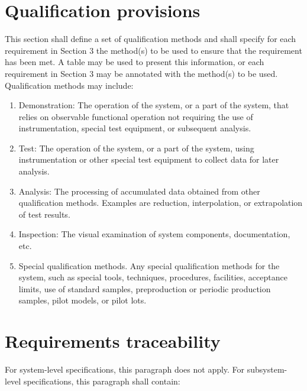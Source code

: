 \section{Qualification provisions}

This section shall define a set of qualification methods and shall
specify for each requirement in Section 3 the method(s) to be used to
ensure that the requirement has been met. A table may be used to present
this information, or each requirement in Section 3 may be annotated with
the method(s) to be used. Qualification methods may include:

\begin{enumerate}
\itemsep1pt\parskip0pt
\item
  Demonstration: The operation of the system, or a part of the system,
  that relies on observable functional operation not requiring the use
  of instrumentation, special test equipment, or subsequent analysis.
\item
  Test: The operation of the system, or a part of the system, using
  instrumentation or other special test equipment to collect data for
  later analysis.
\item
  Analysis: The processing of accumulated data obtained from other
  qualification methods. Examples are reduction, interpolation, or
  extrapolation of test results.
\item
  Inspection: The visual examination of system components,
  documentation, etc.
\item
  Special qualification methods. Any special qualification methods for
  the system, such as special tools, techniques, procedures, facilities,
  acceptance limits, use of standard samples, preproduction or periodic
  production samples, pilot models, or pilot lots.
\end{enumerate}

\section{Requirements traceability}

For system-level specifications, this paragraph does not apply. For
subsystem-level specifications, this paragraph shall contain:

